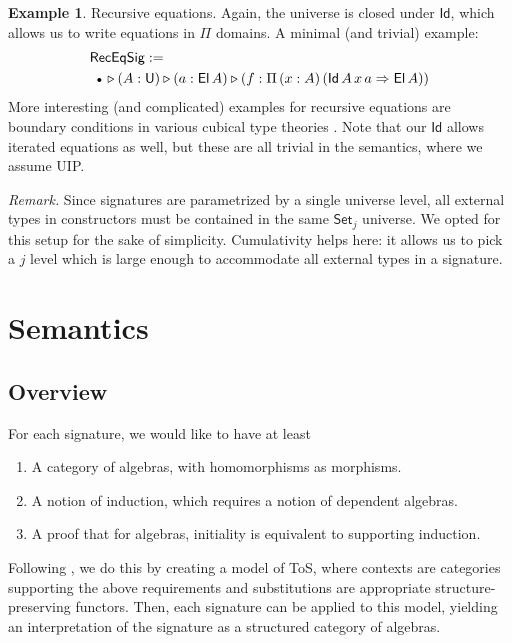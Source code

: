 \documentclass{article}
\theoremstyle{definition}
\newtheorem{example}{Example}
\theoremstyle{theorem}
\newcommand{\U}{\mathsf{U}}
\newcommand{\El}{\mathsf{El}}
\newcommand{\Id}{\mathsf{Id}}
\newcommand{\Set}{\mathsf{Set}}
\newcommand{\ext}{\triangleright}
\newcommand{\emptycon}{\scaleobj{.75}\bullet}
\newcommand{\Pii}{\Pi}
\newcommand{\arri}{\Rightarrow}
\begin{document}
\begin{example}{Recursive equations}. Again, the universe is closed under $\Id$, which allows us to write equations
in $\Pii$ domains. A minimal (and trivial) example:
\begin{alignat*}{3}
  & \mathsf{RecEqSig} :=\\
  & \hspace{0.5em}\emptycon\,\ext (A : \U) \ext (a : \El\,A)\ext (f : \Pii\,(x : A)\,(\Id\,A\,x\,a\arri\El\,A))
\end{alignat*}
More interesting (and complicated) examples for recursive equations are boundary
conditions in various cubical type theories \cite{cchm,
  angiuli2016computational, angiuli2018cartesian}. Note that our $\Id$ allows
iterated equations as well, but these are all trivial in the semantics, where we
assume UIP.
\end{example}


\emph{Remark.} Since signatures are parametrized by a single universe level, all
external types in constructors must be contained in the same $\Set_j$
universe. We opted for this setup for the sake of simplicity. Cumulativity helps
here: it allows us to pick a $j$ level which is large enough to accommodate all
external types in a signature.


\section{Semantics}
\label{sec:semantics}

\subsection{Overview}\label{sec:overview}

For each signature, we would like to have at least
\begin{enumerate}
  \item A category of algebras, with homomorphisms as morphisms.
  \item A notion of induction, which requires a notion of dependent algebras.
  \item A proof that for algebras, initiality is equivalent to supporting induction.
\end{enumerate}

Following \cite{kaposi2019constructing}, we do this by creating a model of ToS,
where contexts are categories supporting the above requirements and
substitutions are appropriate structure-preserving functors. Then, each signature can be applied to this model, yielding an interpretation of the signature
as a structured category of algebras.
\end{document}
